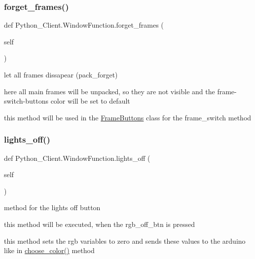 \subsubsection{\texorpdfstring{forget\+\_\+frames()}{forget\_frames()}}
{\footnotesize\ttfamily def Python\+\_\+\+Client.\+Window\+Function.\+forget\+\_\+frames (\begin{DoxyParamCaption}\item[{}]{self }\end{DoxyParamCaption})}



let all frames dissapear (pack\+\_\+forget) 

here all main frames will be unpacked, so they are not visible and the frame-\/switch-\/buttons color will be set to default

this method will be used in the \mbox{\hyperlink{class_python___client_1_1_frame_buttons}{Frame\+Buttons}} class for the frame\+\_\+switch method \mbox{\label{class_python___client_1_1_window_function_a9b35486b2d7a0320f38feb86d568ed87}} 
\subsubsection{\texorpdfstring{lights\+\_\+off()}{lights\_off()}}
{\footnotesize\ttfamily def Python\+\_\+\+Client.\+Window\+Function.\+lights\+\_\+off (\begin{DoxyParamCaption}\item[{}]{self }\end{DoxyParamCaption})}



method for the lights off button 

this method will be executed, when the rgb\+\_\+off\+\_\+btn is pressed

this method sets the rgb variables to zero and sends these values to the arduino like in \mbox{\hyperlink{class_python___client_1_1_window_function_a065ec1b6535adc5009029b90060ed44e}{choose\+\_\+color()}} method \mbox{\label{class_python___client_1_1_window_function_aec21cc89e2085eb8d8adabf018ccd0eb}} 
